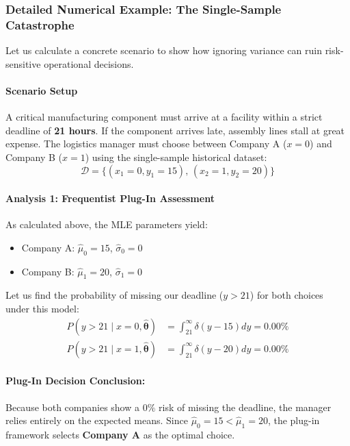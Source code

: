 \documentclass{article}
\begin{document}
\subsubsection{Detailed Numerical Example: The Single-Sample Catastrophe}

Let us calculate a concrete scenario to show how ignoring variance can ruin risk-sensitive operational decisions.

\paragraph{Scenario Setup}
A critical manufacturing component must arrive at a facility within a strict deadline of \textbf{21 hours}. If the component arrives late, assembly lines stall at great expense. The logistics manager must choose between Company A ($x=0$) and Company B ($x=1$) using the single-sample historical dataset:
\begin{equation}
\mathcal{D} = \{(x_1 = 0, y_1 = 15), \, (x_2 = 1, y_2 = 20)\}
\end{equation}

\paragraph{Analysis 1: Frequentist Plug-In Assessment}
As calculated above, the MLE parameters yield:
\begin{itemize}
    \item Company A: $\hat{\mu}_0 = 15$, $\hat{\sigma}_0 = 0$
    \item Company B: $\hat{\mu}_1 = 20$, $\hat{\sigma}_1 = 0$
\end{itemize}

Let us find the probability of missing our deadline ($y > 21$) for both choices under this model:
\begin{align}
P(y > 21 \mid x=0, \hat{\boldsymbol{\theta}}) &= \int_{21}^{\infty} \delta(y - 15) dy = 0.00\% \\
P(y > 21 \mid x=1, \hat{\boldsymbol{\theta}}) &= \int_{21}^{\infty} \delta(y - 20) dy = 0.00\%
\end{align}

\paragraph{Plug-In Decision Conclusion:}
Because both companies show a $0\%$ risk of missing the deadline, the manager relies entirely on the expected means. Since $\hat{\mu}_0 = 15 < \hat{\mu}_1 = 20$, the plug-in framework selects \textbf{Company A} as the optimal choice.
\end{document}
